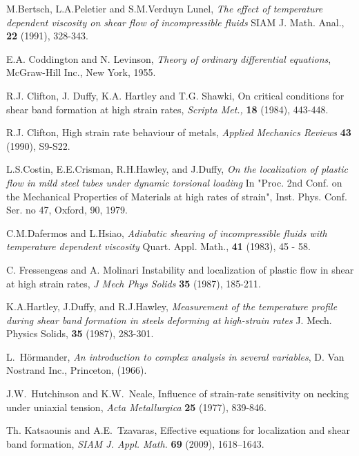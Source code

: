 \documentclass[a4paper,11pt]{article}
\theoremstyle{remark}
\begin{document}
\vfil\eject

\begin{thebibliography}{10}

{\sc M.Bertsch, L.A.Peletier and S.M.Verduyn Lunel},
{\sl The effect of temperature dependent viscosity on shear flow of incompressible fluids}
\newblock SIAM J. Math. Anal., {\bf 22} (1991), 328-343.

{\sc E.A. Coddington and N. Levinson},
{\it Theory of ordinary differential equations},
McGraw-Hill Inc., New York, 1955.

{\sc R.J. Clifton, J. Duffy, K.A. Hartley and T.G. Shawki},
{ On critical conditions for shear band formation at high strain rates}, {\it Scripta Met.,} {\bf 18} (1984), 443-448.

{\sc R.J. Clifton},  High strain rate behaviour of metals,
{\it Applied Mechanics Reviews}
{\bf 43} (1990), S9-S22.

{\sc L.S.Costin, E.E.Crisman, R.H.Hawley, and J.Duffy},
{\sl On the localization of plastic flow in mild steel tubes under dynamic torsional loading}
 In "Proc. 2nd Conf. on the Mechanical Properties of Materials at high rates of strain",
 Inst. Phys. Conf. Ser. no 47, Oxford, 90, 1979.

{\sc C.M.Dafermos and L.Hsiao},
{\sl Adiabatic shearing of incompressible fluids with temperature dependent viscosity}
Quart. Appl. Math., {\bf 41} (1983), 45 - 58.

{\sc C. Fressengeas and A. Molinari }
{ Instability and localization of plastic flow in shear at high strain rates}, {\it J Mech Phys Solids} {\bf 35} (1987), 185-211.

{\sc K.A.Hartley, J.Duffy, and R.J.Hawley},
{\sl Measurement of the temperature profile during shear band formation in steels deforming at high-strain rates}
 J. Mech. Physics Solids, {\bf 35} (1987), 283-301.

{\sc L.~H\"ormander},
{\it An introduction to complex analysis in several variables},
D. Van Nostrand Inc., Princeton, (1966).


{\sc J.W.~Hutchinson and K.W.~Neale},
Influence of strain-rate sensitivity on necking under uniaxial tension,
{\it  Acta Metallurgica} {\bf 25} (1977), 839-846.

{\sc Th. Katsaounis and A.E.~Tzavaras},
Effective equations for localization and shear band formation,
{\it SIAM J. Appl. Math.}  {\bf 69} (2009), 1618--1643.


\end{thebibliography}
\end{document}
